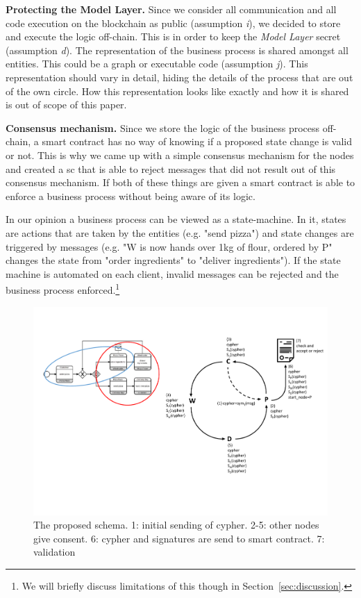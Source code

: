 \documentclass[runningheads]{llncs}
\newcommand{\ber}[1]{\textit{#1}}
\newcommand{\refsec}[1]{Section~\ref{#1}}
\renewcommand{\bigbreak}{}
\begin{document}
\bigbreak
\textbf{Protecting the Model Layer.} Since we consider all communication and all code execution on the blockchain as public (assumption \ber{i}), we decided to store and execute the logic off-chain. This is in order to keep the \ber{Model Layer} secret (assumption \ber{d}). The representation of the business process is shared amongst all entities. This could be a graph or executable code (assumption \ber{j}). This representation should vary in detail, hiding the details of the process that are out of the own circle. How this representation looks like exactly and how it is shared is out of scope of this paper.


\bigbreak
\textbf{Consensus mechanism.} Since we store the logic of the business process off-chain, a smart contract has no way of knowing if a proposed state change is valid or not. This is why we came up with a simple consensus mechanism for the nodes and created a sc that is able to reject messages that did not result out of this consensus mechanism. If both of these things are given a smart contract is able to enforce a business process without being aware of its logic. 

In our opinion a business process can be viewed as a state-machine. In it, states are actions that are taken by the entities (e.g. "send pizza") and state changes are triggered by messages (e.g. "W is now hands over 1kg of flour, ordered by P" changes the state from "order ingredients" to "deliver ingredients"). If the state machine is automated on each client, invalid messages can be rejected and the business process enforced.\footnote{We will briefly discuss limitations of this though in \refsec{sec:discussion}.}

\begin{center}
\begin{figure}
    \centering
    \includegraphics[trim=13cm 4cm 0cm 3cm,clip=true,scale=0.5]{schema.pdf}
    \caption{The proposed schema. 1: initial sending of cypher. 2-5: other nodes give consent. 6: cypher and signatures are send to smart contract. 7: validation} 
    \label{fig:schema}
\end{figure}
\end{center}
\end{document}
